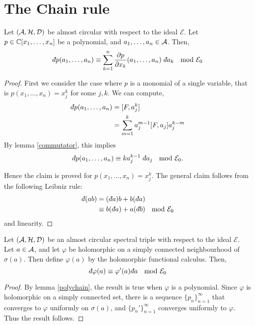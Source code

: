 \section{The Chain rule}

\begin{lemma}
\label{polychain}
    Let $(\mathcal{A},\mathcal{H},\mathcal{D})$ be almost circular with respect
    to the ideal $\mathcal{E}$. Let $p \in \mathbb{C}[x_1,\ldots,x_n]$ be a polynomial,
    and $a_1,\ldots,a_n \in \mathcal{A}$. 
    Then,
    \begin{equation}
        \qd p(a_1,\ldots,a_n) \equiv \sum_{k=1}^n \frac{\partial p}{\partial x_k}(a_1,\ldots,a_n)\;\qd a_k\; \mod{\mathcal{E}_0}
    \end{equation}
\end{lemma}
\begin{proof}
    First we consider the case where $p$ is a monomial of a single variable,
    that is $p(x_1,\ldots,x_n) = x_j^k$ for some $j,k$. We can compute,
    \begin{align}
        \qd p(a_1,\ldots,a_n) &= [F,a_j^k] \\
        &= \sum_{m=1}^{k} a_j^{m-1} [F,a_j] a_j^{k-m}
    \end{align}
    By lemma \ref{commutator}, this implies
    \begin{align}
        \qd p(a_1,\ldots,a_n) \equiv ka_j^{k-1}\; \qd a_j\; \mod{\mathcal{E}_0}.
    \end{align}
    
    Hence the claim is proved for $p(x_1,\ldots,x_n) = x_j^k$. The general claim
    follows from the following Leibniz rule:
    \begin{align}
        \qd (ab) &= (\qd a)b + b(\qd a)\\
                 &\equiv b(\qd a) + a(\qd b) \;\mod{\mathcal{E}_0}
    \end{align}
    and linearity.
\end{proof}

\begin{proposition}
    Let $(\mathcal{A},\mathcal{H},\mathcal{D})$ be an almost circular spectral triple with respect
    to the ideal $\mathcal{E}$. Let $a \in \mathcal{A}$,
    and let $\varphi$ be holomorphic on a simply connected neighbourhood of $\sigma(a)$.
    Then define $\varphi(a)$ by the holomorphic functional calculus. Then,
    \begin{equation}
        \qd \varphi(a) \equiv \varphi'(a)\qd a\;\mod{\mathcal{E}_0}
    \end{equation}
\end{proposition}
\begin{proof}
    By lemma \ref{polychain}, the result is true when $\varphi$
    is a polynomial. Since $\varphi$ is holomorphic on a simply connected set,
    there is a sequence $\{p_n\}_{n=1}^\infty$ that converges to $\varphi$
    uniformly on $\sigma(a)$, and $\{p_n'\}_{n=1}^\infty$ converges
    uniformly to $\varphi$. Thus the result follows.
\end{proof}

